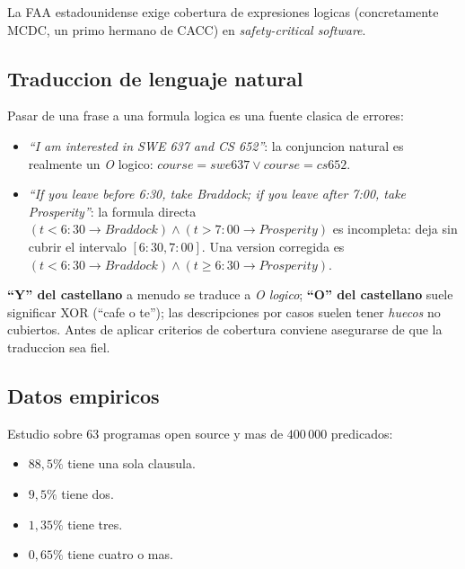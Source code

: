 \documentclass[12pt,a4paper]{article}
\begin{document}
La FAA estadounidense exige cobertura de expresiones logicas (concretamente MCDC, un primo
hermano de CACC) en \textit{safety-critical software}.

\subsection{Traduccion de lenguaje natural}

Pasar de una frase a una formula logica es una fuente clasica de errores:

\begin{itemize}
  \item \emph{``I am interested in SWE 637 and CS 652''}: la conjuncion natural es realmente un
  \emph{O} logico: $\textit{course} = \textit{swe637} \vee \textit{course} = \textit{cs652}$.
  \item \emph{``If you leave before 6:30, take Braddock; if you leave after 7:00, take
  Prosperity''}: la formula directa $(t < 6{:}30 \rightarrow \textit{Braddock}) \wedge
  (t > 7{:}00 \rightarrow \textit{Prosperity})$ es incompleta: deja sin cubrir el intervalo
  $[6{:}30, 7{:}00]$. Una version corregida es $(t < 6{:}30 \rightarrow \textit{Braddock})
  \wedge (t \ge 6{:}30 \rightarrow \textit{Prosperity})$.
\end{itemize}

\begin{ideabox}
\textbf{``Y'' del castellano} a menudo se traduce a \emph{O logico}; \textbf{``O'' del
castellano} suele significar XOR (``cafe o te''); las descripciones por casos suelen tener
\emph{huecos} no cubiertos. Antes de aplicar criterios de cobertura conviene asegurarse de que
la traduccion sea fiel.
\end{ideabox}

\subsection{Datos empiricos}

Estudio sobre 63 programas open source y mas de $400\,000$ predicados:

\begin{itemize}
  \item $88{,}5\%$ tiene una sola clausula.
  \item $9{,}5\%$ tiene dos.
  \item $1{,}35\%$ tiene tres.
  \item $0{,}65\%$ tiene cuatro o mas.
\end{itemize}
\end{document}
